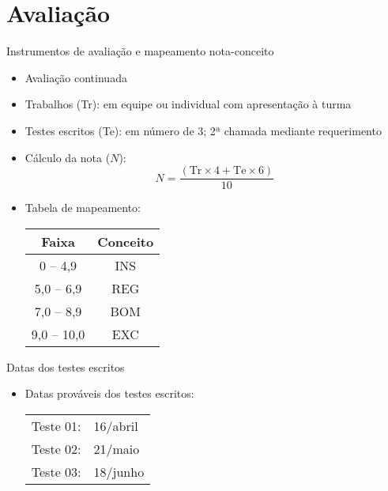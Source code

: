    \section[ slide = false ]{Avaliação}
      \begin{slide}[toc=]{Instrumentos de avaliação e mapeamento nota-conceito}
         \begin{itemize}
            \item Avaliação continuada
            \item Trabalhos (Tr): em equipe ou individual com apresentação à turma
            \item Testes escritos (Te): em número de 3; 2ª chamada mediante requerimento
            \item Cálculo da nota ($N$):
            \begin{equation*}
               N=\frac{( \text{Tr} \times 4 + \text{Te} \times 6 )} {10}
            \end{equation*}
          \item Tabela de mapeamento:
            \begin{table}
               \centering
               \begin{tabular}{c|c}
                  \hline\hline
                  \textbf{Faixa} & \textbf{Conceito}\\
                  \hline
                  0 -- 4,9 & INS\\
                  5,0 -- 6,9 & REG\\
                  7,0 -- 8,9 & BOM\\
                  9,0 -- 10,0 & EXC\\
                  \hline\hline
               \end{tabular}
            \end{table}\end{itemize}
      \end{slide}
      
      \begin{slide}[toc=]{Datas dos testes escritos}
         \begin{itemize}
            \item Datas prováveis dos testes escritos:
            \begin{table}
               \centering
               \begin{tabular}{|l l|}
                  \hline
                  Teste 01: & 16/abril\\
                  Teste 02: & 21/maio\\
                  Teste 03: & 18/junho\\
                  \hline
               \end{tabular}
            \end{table}
         \end{itemize}
      \end{slide}

